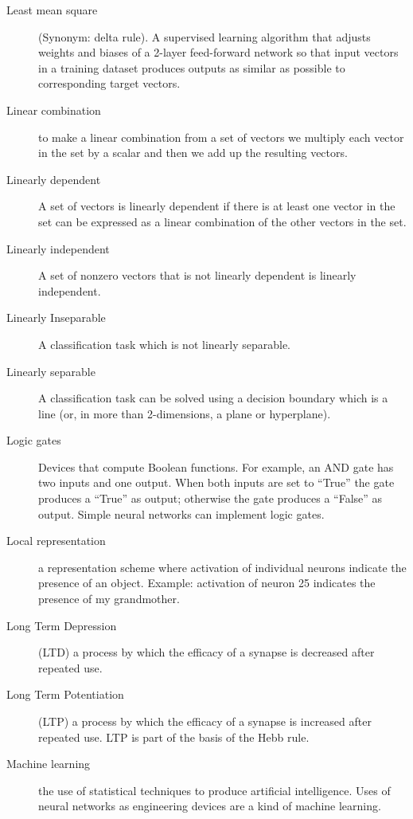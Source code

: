 \begin{description}
\item[Least mean square] (Synonym: delta rule). A supervised learning algorithm that adjusts weights and biases of a 2-layer feed-forward network so that input vectors in a training dataset produces outputs as similar as possible to corresponding target vectors.

\item[Linear combination] to make a linear combination from a set of vectors we multiply each vector in the set by a scalar and then we add up the resulting vectors.

\item[Linearly dependent] A set of vectors is linearly dependent if there is at least one vector in the set can be expressed as a linear combination of the other vectors in the set.

\item[Linearly independent] A set of nonzero vectors that is not linearly
dependent is linearly independent.

\item[Linearly Inseparable] A classification task which is not linearly separable.

\item[Linearly separable] A classification task can be solved using a decision boundary which is a line (or, in more than 2-dimensions, a plane or hyperplane).

\item[Logic gates] Devices that compute Boolean functions. For example, an AND gate has two inputs and one output. When both inputs are set to ``True'' the gate produces a ``True'' as output; otherwise the gate produces a ``False'' as output. Simple neural networks can implement logic gates.

\item[Local representation] a representation scheme where activation of individual neurons indicate the presence of an object. Example: activation of neuron 25 indicates the presence of my grandmother.

\item[Long Term Depression] (LTD) a  process by which the efficacy of a synapse is decreased after repeated use.

\item[Long Term Potentiation] (LTP) a process by which the efficacy of a synapse is increased after repeated use. LTP is part of the basis of the Hebb rule.

\item[Machine learning] the use of statistical techniques to produce artificial intelligence. Uses of neural networks as engineering devices are a kind of machine learning.


\end{description}
